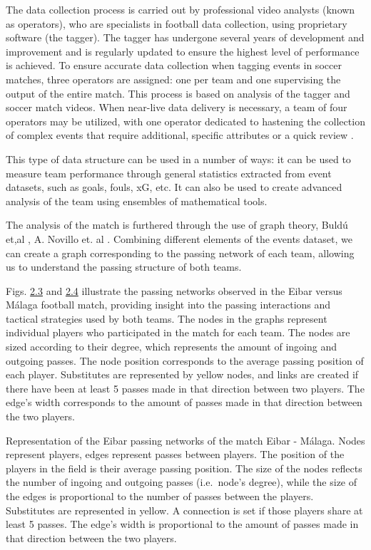\documentclass[twoside,nohyper]{tufte-book}
\begin{document}
The data collection process is carried out by professional video
analysts (known as operators), who are specialists in football data
collection, using proprietary software (the tagger). The tagger has
undergone several years of development and improvement and is regularly
updated to ensure the highest level of performance is achieved. To
ensure accurate data collection when tagging events in soccer matches,
three operators are assigned: one per team and one supervising the
output of the entire match. This process is based on analysis of the
tagger and soccer match videos. When near-live data delivery is
necessary, a team of four operators may be utilized, with one operator
dedicated to hastening the collection of complex events that require
additional, specific attributes or a quick review \citep{3}.

This type of data structure can be used in a number of ways: it can be
used to measure team performance through general statistics extracted
from event datasets, such as goals, fouls, xG, etc. It can also be used
to create advanced analysis of the team using ensembles of mathematical
tools.

The analysis of the match is furthered through the use of graph theory,
Buldú et,al \citep{Buldu}, A. Novillo et. al \citep{NOVILLO2024114355}. Combining
different elements of the events dataset, we can create a graph
corresponding to the passing network of each team, allowing us to
understand the passing structure of both teams.

Figs. \protect\hyperlink{f2.3}{2.3} and
\protect\hyperlink{f2.4}{2.4} illustrate the
passing networks observed in the Eibar versus Málaga football match,
providing insight into the passing interactions and tactical strategies
used by both teams. The nodes in the graphs represent individual players
who participated in the match for each team. The nodes are sized
according to their degree, which represents the amount of ingoing and
outgoing passes. The node position corresponds to the average passing
position of each player. Substitutes are represented by yellow nodes,
and links are created if there have been at least 5 passes made in that
direction between two players. The edge's width corresponds to the
amount of passes made in that direction between the two players.

Representation of the Eibar passing networks of the match
Eibar - Málaga. Nodes represent players, edges represent passes between
players. The position of the players in the field is their average
passing position. The size of the nodes reflects the number of ingoing
and outgoing passes (i.e.~node's degree), while the size of the edges is
proportional to the number of passes between the players. Substitutes
are represented in yellow. A connection is set if those players share at
least 5 passes. The edge's width is proportional to the amount of passes
made in that direction between the two players.
\end{document}
